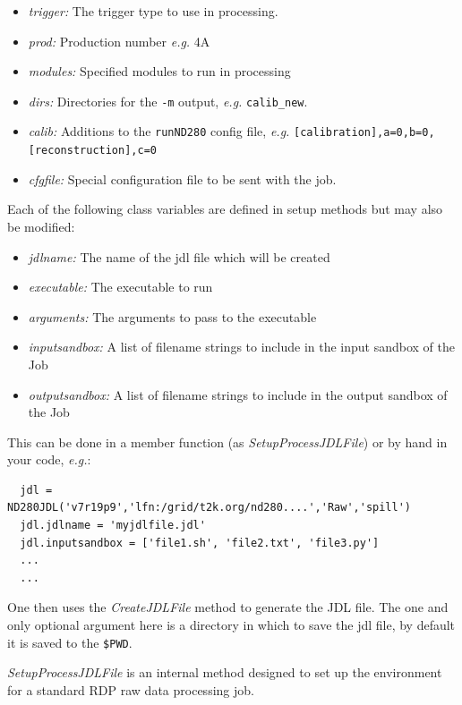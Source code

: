 \documentclass[11pt]{article}
\begin{document}
\begin{itemize}
\item{\textit{trigger:} The trigger type to use in processing.}
\item{\textit{prod:} Production number \textit{e.g.} 4A}
\item{\textit{modules:} Specified modules to run in processing}
\item{\textit{dirs:} Directories for the \verb+-m+ output,
  \textit{e.g.} \verb+calib_new+.}
\item{\textit{calib:} Additions to the \verb+runND280+ config file,
  \textit{e.g.} \verb+[calibration],a=0,b=0,[reconstruction],c=0+}
\item{\textit{cfgfile:} Special configuration file to be sent with the job.}
\end{itemize}

Each of the following class variables are defined in setup methods but
may also be modified:

\begin{itemize}
\item{\textit{jdlname:} The name of the jdl file which will be created}
\item{\textit{executable:} The executable to run}
\item{\textit{arguments:} The arguments to pass to the executable}
\item{\textit{inputsandbox:} A list of filename strings to include in the input sandbox of the Job}
\item{\textit{outputsandbox:} A list of filename strings to include in the output sandbox of the Job}
\end{itemize}

This can be done in a member function (as
\textit{SetupProcessJDLFile}) or by hand in your code, \textit{e.g.}:

\begin{verbatim}
  jdl = ND280JDL('v7r19p9','lfn:/grid/t2k.org/nd280....','Raw','spill')
  jdl.jdlname = 'myjdlfile.jdl'
  jdl.inputsandbox = ['file1.sh', 'file2.txt', 'file3.py']
  ...
  ...
\end{verbatim}

One then uses the \textit{CreateJDLFile} method to generate the JDL
file. The one and only optional argument here is a directory in which
to save the jdl file, by default it is saved to the \verb+$PWD+.

\textit{SetupProcessJDLFile} is an internal method designed to set up the
environment for a standard RDP raw data processing job.
\end{document}
